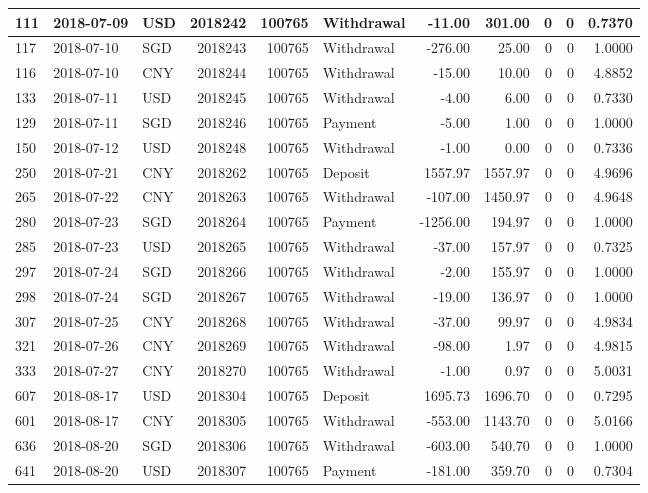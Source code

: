 \documentclass[]{article}
\begin{document}
\begin{table}[H]
\begin{tabular}{l|l|l|r|r|l|r|r|r|r|r}
\hline
111 & 2018-07-09 & USD & 2018242 & 100765 & Withdrawal & -11.00 & 301.00 & 0 & 0 & 0.7370\\
\hline
117 & 2018-07-10 & SGD & 2018243 & 100765 & Withdrawal & -276.00 & 25.00 & 0 & 0 & 1.0000\\
\hline
116 & 2018-07-10 & CNY & 2018244 & 100765 & Withdrawal & -15.00 & 10.00 & 0 & 0 & 4.8852\\
\hline
133 & 2018-07-11 & USD & 2018245 & 100765 & Withdrawal & -4.00 & 6.00 & 0 & 0 & 0.7330\\
\hline
129 & 2018-07-11 & SGD & 2018246 & 100765 & Payment & -5.00 & 1.00 & 0 & 0 & 1.0000\\
\hline
150 & 2018-07-12 & USD & 2018248 & 100765 & Withdrawal & -1.00 & 0.00 & 0 & 0 & 0.7336\\
\hline
250 & 2018-07-21 & CNY & 2018262 & 100765 & Deposit & 1557.97 & 1557.97 & 0 & 0 & 4.9696\\
\hline
265 & 2018-07-22 & CNY & 2018263 & 100765 & Withdrawal & -107.00 & 1450.97 & 0 & 0 & 4.9648\\
\hline
280 & 2018-07-23 & SGD & 2018264 & 100765 & Payment & -1256.00 & 194.97 & 0 & 0 & 1.0000\\
\hline
285 & 2018-07-23 & USD & 2018265 & 100765 & Withdrawal & -37.00 & 157.97 & 0 & 0 & 0.7325\\
\hline
297 & 2018-07-24 & SGD & 2018266 & 100765 & Withdrawal & -2.00 & 155.97 & 0 & 0 & 1.0000\\
\hline
298 & 2018-07-24 & SGD & 2018267 & 100765 & Withdrawal & -19.00 & 136.97 & 0 & 0 & 1.0000\\
\hline
307 & 2018-07-25 & CNY & 2018268 & 100765 & Withdrawal & -37.00 & 99.97 & 0 & 0 & 4.9834\\
\hline
321 & 2018-07-26 & CNY & 2018269 & 100765 & Withdrawal & -98.00 & 1.97 & 0 & 0 & 4.9815\\
\hline
333 & 2018-07-27 & CNY & 2018270 & 100765 & Withdrawal & -1.00 & 0.97 & 0 & 0 & 5.0031\\
\hline
607 & 2018-08-17 & USD & 2018304 & 100765 & Deposit & 1695.73 & 1696.70 & 0 & 0 & 0.7295\\
\hline
601 & 2018-08-17 & CNY & 2018305 & 100765 & Withdrawal & -553.00 & 1143.70 & 0 & 0 & 5.0166\\
\hline
636 & 2018-08-20 & SGD & 2018306 & 100765 & Withdrawal & -603.00 & 540.70 & 0 & 0 & 1.0000\\
\hline
641 & 2018-08-20 & USD & 2018307 & 100765 & Payment & -181.00 & 359.70 & 0 & 0 & 0.7304\\

\end{tabular}
\end{table}
\end{document}
